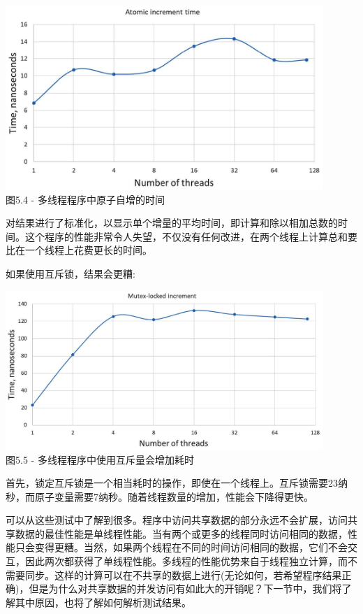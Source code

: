 \begin{center}
\includegraphics[width=0.9\textwidth]{content/1/chapter5/images/4.jpg}\\
图5.4 - 多线程程序中原子自增的时间
\end{center}

对结果进行了标准化，以显示单个增量的平均时间，即计算和除以相加总数的时间。这个程序的性能非常令人失望，不仅没有任何改进，在两个线程上计算总和要比在一个线程上花费更长的时间。

如果使用互斥锁，结果会更糟:

\begin{center}
\includegraphics[width=0.9\textwidth]{content/1/chapter5/images/5.jpg}\\
图5.5 - 多线程程序中使用互斥量会增加耗时
\end{center}

首先，锁定互斥锁是一个相当耗时的操作，即使在一个线程上。互斥锁需要23纳秒，而原子变量需要7纳秒。随着线程数量的增加，性能会下降得更快。

可以从这些测试中了解到很多。程序中访问共享数据的部分永远不会扩展，访问共享数据的最佳性能是单线程性能。当有两个或更多的线程同时访问相同的数据，性能只会变得更糟。当然，如果两个线程在不同的时间访问相同的数据，它们不会交互，因此两次都获得了单线程性能。多线程的性能优势来自于线程独立计算，而不需要同步。这样的计算可以在不共享的数据上进行(无论如何，若希望程序结果正确)，但是为什么对共享数据的并发访问有如此大的开销呢？下一节中，我们将了解其中原因，也将了解如何解析测试结果。








